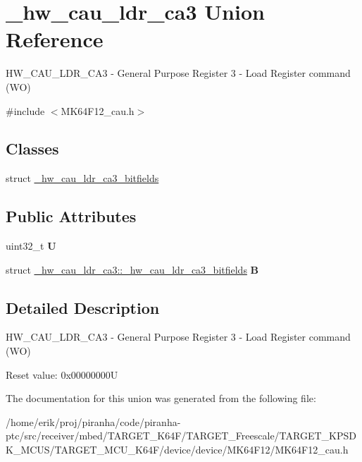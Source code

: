 \hypertarget{union__hw__cau__ldr__ca3}{}\section{\+\_\+hw\+\_\+cau\+\_\+ldr\+\_\+ca3 Union Reference}
\label{union__hw__cau__ldr__ca3}


H\+W\+\_\+\+C\+A\+U\+\_\+\+L\+D\+R\+\_\+\+C\+A3 -\/ General Purpose Register 3 -\/ Load Register command (WO)  




{\ttfamily \#include $<$M\+K64\+F12\+\_\+cau.\+h$>$}

\subsection*{Classes}
\begin{DoxyCompactItemize}
\item 
struct \hyperlink{struct__hw__cau__ldr__ca3_1_1__hw__cau__ldr__ca3__bitfields}{\+\_\+hw\+\_\+cau\+\_\+ldr\+\_\+ca3\+\_\+bitfields}
\end{DoxyCompactItemize}
\subsection*{Public Attributes}
\begin{DoxyCompactItemize}
\item 
uint32\+\_\+t {\bfseries U}\hypertarget{union__hw__cau__ldr__ca3_a960aa388dc4cbd7eeb413c02b58112dd}{}\label{union__hw__cau__ldr__ca3_a960aa388dc4cbd7eeb413c02b58112dd}

\item 
struct \hyperlink{struct__hw__cau__ldr__ca3_1_1__hw__cau__ldr__ca3__bitfields}{\+\_\+hw\+\_\+cau\+\_\+ldr\+\_\+ca3\+::\+\_\+hw\+\_\+cau\+\_\+ldr\+\_\+ca3\+\_\+bitfields} {\bfseries B}\hypertarget{union__hw__cau__ldr__ca3_aa2935122d1397e74638767dcf43182a2}{}\label{union__hw__cau__ldr__ca3_aa2935122d1397e74638767dcf43182a2}

\end{DoxyCompactItemize}


\subsection{Detailed Description}
H\+W\+\_\+\+C\+A\+U\+\_\+\+L\+D\+R\+\_\+\+C\+A3 -\/ General Purpose Register 3 -\/ Load Register command (WO) 

Reset value\+: 0x00000000U 

The documentation for this union was generated from the following file\+:\begin{DoxyCompactItemize}
\item 
/home/erik/proj/piranha/code/piranha-\/ptc/src/receiver/mbed/\+T\+A\+R\+G\+E\+T\+\_\+\+K64\+F/\+T\+A\+R\+G\+E\+T\+\_\+\+Freescale/\+T\+A\+R\+G\+E\+T\+\_\+\+K\+P\+S\+D\+K\+\_\+\+M\+C\+U\+S/\+T\+A\+R\+G\+E\+T\+\_\+\+M\+C\+U\+\_\+\+K64\+F/device/device/\+M\+K64\+F12/M\+K64\+F12\+\_\+cau.\+h\end{DoxyCompactItemize}
